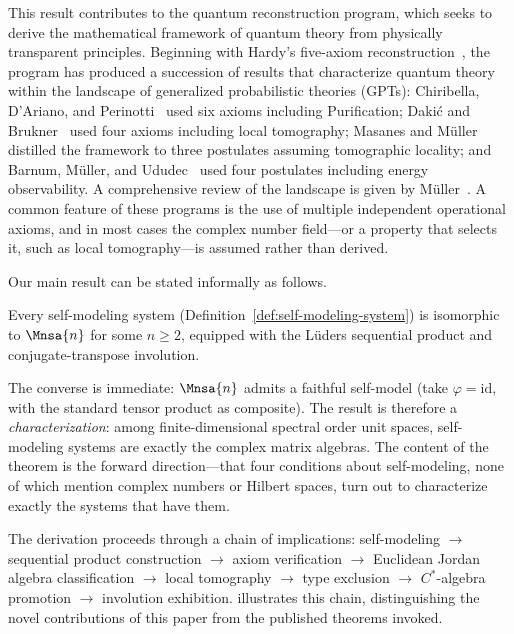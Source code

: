 \documentclass[11pt]{article}
\begin{document}
This result contributes to the quantum reconstruction program, which
seeks to derive the mathematical framework of quantum theory from
physically transparent principles.  Beginning with Hardy's five-axiom
reconstruction~\cite{Hardy2001}, the program has produced a succession
of results that characterize quantum theory within the landscape of
generalized probabilistic theories (GPTs): Chiribella, D'Ariano, and
Perinotti~\cite{CDP2011} used six axioms including Purification;
Daki\'c and Brukner~\cite{DakicBrukner2011} used four axioms
including local tomography; Masanes and
M\"uller~\cite{MasanesMueller2011,MasanesMueller2013} distilled the
framework to three postulates assuming tomographic locality; and
Barnum, M\"uller, and
Ududec~\cite{BarnumMuellerUdudec2014} used four postulates including
energy observability.  A comprehensive review of the landscape is
given by M\"uller~\cite{Mueller2021}.  A common feature of these
programs is the use of multiple independent operational axioms, and in
most cases the complex number field---or a property that selects it,
such as local tomography---is assumed rather than derived.

Our main result can be stated informally as follows.

\begin{theorem}\label{thm:main-informal}
  Every self-modeling system
  (Definition~\ref{def:self-modeling-system}) is isomorphic to
  $\Mnsa{n}$ for some $n \geq 2$, equipped with the L\"uders
  sequential product and conjugate-transpose involution.
\end{theorem}

\noindent
The converse is immediate: $\Mnsa{n}$ admits a faithful self-model
(take $\varphi = \mathrm{id}$, with the standard tensor product as
composite).  The result is therefore a \emph{characterization}: among
finite-dimensional spectral order unit spaces, self-modeling systems
are exactly the complex matrix algebras.  The content of the theorem
is the forward direction---that four conditions about self-modeling,
none of which mention complex numbers or Hilbert spaces, turn out to
characterize exactly the systems that have them.

The derivation proceeds through a chain of implications:
self-modeling $\to$ sequential product construction $\to$ axiom
verification $\to$ Euclidean Jordan algebra classification $\to$
local tomography $\to$ type exclusion $\to$ $C^{*}$-algebra promotion
$\to$ involution exhibition.
 illustrates this chain, distinguishing the novel
contributions of this paper from the published theorems invoked.
\end{document}
